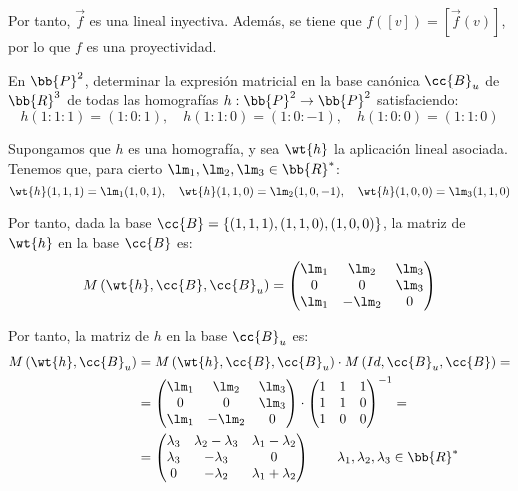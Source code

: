 \begin{ejercicio}
    Por tanto, $\vec{f}$ es una lineal inyectiva. Además, se tiene que $f([v]) = \left[\vec{f}(v)\right]$, por lo que $f$ es una proyectividad.
\end{ejercicio}



\begin{ejercicio}
    En $\bb{P}^2$, determinar la expresión matricial en la base canónica $\cc{B}_u$ de $\bb{R}^3$ de todas las
    homografías $h:\bb{P}^2\to \bb{P}^2$ satisfaciendo:
    \begin{equation*}
        h(1:1:1) = (1:0:1), \quad h(1:1:0) = (1:0:-1), \quad h(1:0:0) = (1:1:0)
    \end{equation*}

    Supongamos que $h$ es una homografía, y sea $\wt{h}$ la aplicación lineal asociada. Tenemos que, para cierto $\lm_1, \lm_2, \lm_3 \in \bb{R}^\ast$:
    \begin{equation*}
        \wt{h}(1,1,1) = \lm_1 (1,0,1), \quad \wt{h}(1,1,0) = \lm_2 (1,0,-1), \quad \wt{h}(1,0,0) = \lm_3 (1,1,0)
    \end{equation*}

    Por tanto, dada la base $\cc{B} = \{(1,1,1), (1,1,0), (1,0,0)\}$, la matriz de $\wt{h}$ en la base $\cc{B}$ es:
    \begin{equation*}
        M\left(\wt{h}, \cc{B}, \cc{B}_u\right) = \begin{pmatrix}
            \lm_1 & \lm_2 & \lm_3 \\
            0 & 0 & \lm_3 \\
            \lm_1 & -\lm_2 & 0
        \end{pmatrix}
    \end{equation*}

    Por tanto, la matriz de $h$ en la base $\cc{B}_u$ es:
    \begin{align*}
        M\left(\wt{h}, \cc{B}_u\right) &= M\left(\wt{h}, \cc{B}, \cc{B}_u\right) \cdot M\left(Id, \cc{B}_u, \cc{B}\right) = \\
        &= \begin{pmatrix}
            \lm_1 & \lm_2 & \lm_3 \\
            0 & 0 & \lm_3 \\
            \lm_1 & -\lm_2 & 0
        \end{pmatrix} \cdot \begin{pmatrix}
            1 & 1 & 1 \\
            1 & 1 & 0 \\
            1 & 0 & 0
        \end{pmatrix}^{-1}
        =\\&= \begin{pmatrix}
            \lambda_3 & \lambda_2-\lambda_3 & \lambda_1-\lambda_2 \\
            \lambda_3 & -\lambda_3 & 0 \\
            0 & -\lambda_2 & \lambda_1+\lambda_2
            \end{pmatrix} \qquad \lambda_1, \lambda_2, \lambda_3 \in \bb{R}^\ast
    \end{align*}


\end{ejercicio}

